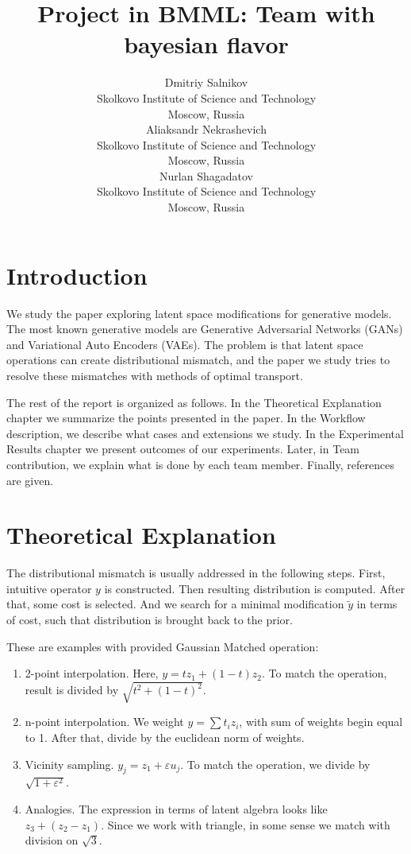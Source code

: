 \documentclass{article}
\title{Project in BMML: Team with bayesian flavor}
\author{
   \And
  Dmitriy Salnikov   \\
  Skolkovo Institute of Science and Technology \\
  Moscow, Russia \\
   \And
  Aliaksandr Nekrashevich \\
  Skolkovo Institute of Science and Technology \\
  Moscow, Russia \\
   \And
  Nurlan Shagadatov\\
  Skolkovo Institute of Science and Technology \\
  Moscow, Russia \\
}
\begin{document}
\maketitle




\section{Introduction}

We study the paper \cite{main} 
exploring latent space modifications 
for generative models. The most known generative models 
are Generative Adversarial Networks (GANs) and Variational 
Auto Encoders (VAEs). The problem is that latent space operations
can create distributional mismatch, and the paper we study 
tries to resolve these mismatches with methods of 
optimal transport.

The rest of the report is organized as follows. In the 
Theoretical Explanation chapter we summarize the points presented
in the paper. In the Workflow description, we describe what 
cases and extensions we study. In the Experimental Results
chapter we present outcomes of our experiments.
Later, in Team contribution, we explain what is done by each team member. Finally, references are given.


\section{Theoretical Explanation}

The distributional mismatch is usually addressed in the following
steps. First, intuitive operator $y$ is constructed. Then resulting distribution is computed. After that, some cost is selected.
And we search for a minimal modification $\tilde{y}$ in terms of
cost, such that distribution is brought back to the prior.

These are examples with provided Gaussian Matched operation:

\begin{enumerate}
    \item 2-point interpolation. Here, $y = tz_1 + (1-t)z_2$. 
        To match the operation, result is divided by
        $\sqrt{t^2 + (1-t)^2}$.
    \item n-point interpolation. We weight 
        $y=\sum t_i z_i$, with sum of weights begin equal to 1.
        After that, divide by the euclidean norm of weights.
    \item Vicinity sampling. $y_j = z_1 + \varepsilon u_j$. 
        To match the operation, we divide by 
        $\sqrt{1 + \varepsilon^2}$.
    \item Analogies. The expression in terms of latent algebra
        looks like $z_3 + (z_2 - z_1)$. Since we work with
        triangle, in some sense we match with division on 
        $\sqrt{3}$.
\end{enumerate}
\end{document}
